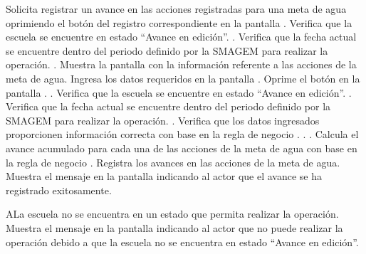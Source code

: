  \begin{UCtrayectoria}
    \UCpaso[\UCactor] Solicita registrar un avance en las acciones registradas para una meta de agua oprimiendo el botón \botAutoAjus del registro correspondiente en la pantalla .
    \UCpaso[\UCsist] Verifica que la escuela se encuentre en estado ``Avance en edición''. .
    \UCpaso[\UCsist] Verifica que la fecha actual se encuentre dentro del periodo definido por la SMAGEM para realizar la operación. .
    \UCpaso[\UCsist] Muestra la pantalla  con la información referente a las acciones de la meta de agua. 
    \UCpaso[\UCactor] Ingresa los datos requeridos en la pantalla . \label{cus19:RegAvanceAgua}
    \UCpaso[\UCactor] Oprime el botón  en la pantalla . .
    \UCpaso[\UCsist] Verifica que la escuela se encuentre en estado ``Avance en edición''. .
    \UCpaso[\UCsist] Verifica que la fecha actual se encuentre dentro del periodo definido por la SMAGEM para realizar la operación. .
    \UCpaso[\UCsist] Verifica que los datos ingresados proporcionen información correcta con base en la regla de negocio .  . .    
    \UCpaso[\UCsist] Calcula el avance acumulado para cada una de las acciones de la meta de agua con base en la regla de negocio .
    \UCpaso[\UCsist] Registra los avances en las acciones de la meta de agua.
    \UCpaso[\UCsist] Muestra el mensaje  en la pantalla  indicando al actor que el avance se ha registrado exitosamente.
 \end{UCtrayectoria}
 
    \begin{UCtrayectoriaA}{A}{La escuela no se encuentra en un estado que permita realizar la operación.}
	\UCpaso[\UCsist] Muestra el mensaje  en la pantalla  indicando al actor que no puede realizar la operación debido a que la escuela no se encuentra en estado ``Avance en edición''. 
    \end{UCtrayectoriaA}
 
